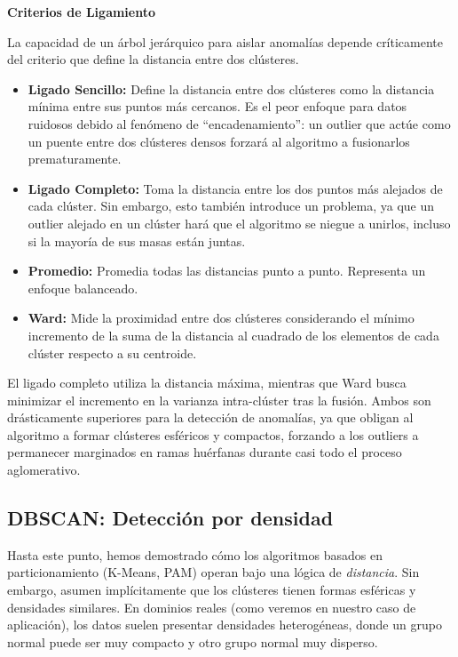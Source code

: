 \textbf{Criterios de Ligamiento}

La capacidad de un árbol jerárquico para aislar anomalías depende críticamente del criterio que define la distancia entre dos clústeres.

\begin{itemize}
	
	\item \textbf{Ligado Sencillo:} Define la distancia entre dos clústeres como la distancia mínima entre sus puntos más cercanos. Es el peor enfoque para datos ruidosos debido al fenómeno de ``encadenamiento'': un outlier que actúe como un puente entre dos clústeres densos forzará al algoritmo a fusionarlos prematuramente.
	
	\item \textbf{Ligado Completo:} Toma la distancia entre los dos puntos más alejados de cada clúster. Sin embargo, esto también introduce un problema, ya que un outlier alejado en un clúster hará que el algoritmo se niegue a unirlos, incluso si la mayoría de sus masas están juntas.
	
	\item \textbf{Promedio:} Promedia todas las distancias punto a punto. Representa un enfoque balanceado.
	
	\item \textbf{Ward:} Mide la proximidad entre dos clústeres considerando el mínimo incremento de la suma de la distancia al cuadrado de los elementos de cada clúster respecto a su centroide.
	
\end{itemize}

El ligado completo utiliza la distancia máxima, mientras que Ward busca minimizar el incremento en la varianza intra-clúster tras la fusión. Ambos son drásticamente superiores para la detección de anomalías, ya que obligan al algoritmo a formar clústeres esféricos y compactos, forzando a los outliers a permanecer marginados en ramas huérfanas durante casi todo el proceso aglomerativo.

\subsection{DBSCAN: Detección por densidad}

Hasta este punto, hemos demostrado cómo los algoritmos basados en particionamiento (K-Means, PAM) operan bajo una lógica de \textit{distancia}. Sin embargo, asumen implícitamente que los clústeres tienen formas esféricas y densidades similares. En dominios reales (como veremos en nuestro caso de aplicación), los datos suelen presentar densidades heterogéneas, donde un grupo normal puede ser muy compacto y otro grupo normal muy disperso.

